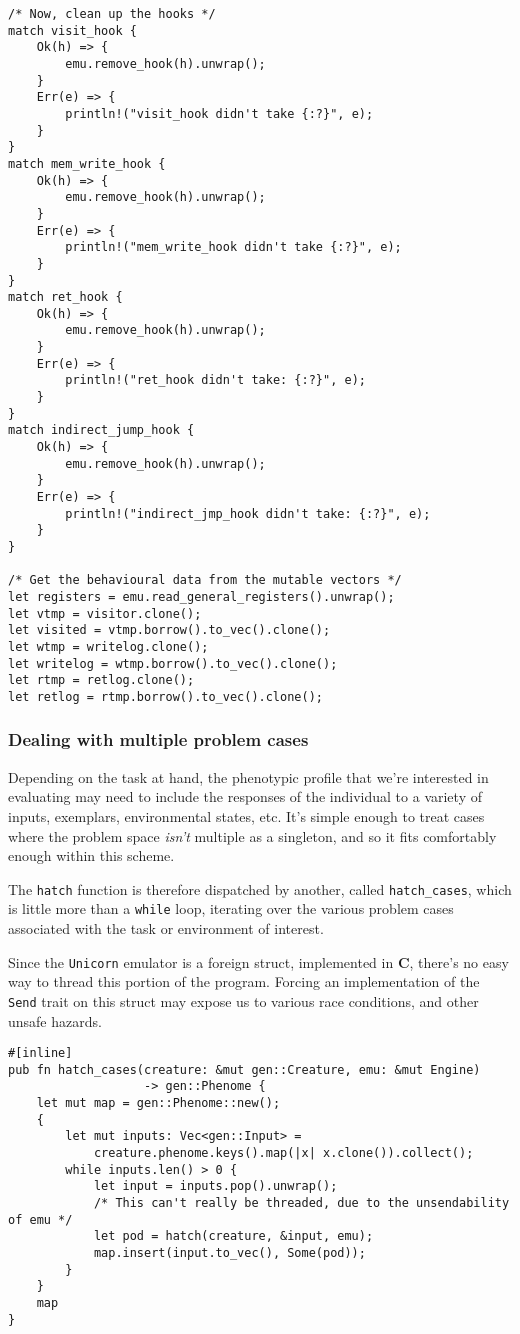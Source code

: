 \documentclass[11pt]{article}
\begin{document}
\lstset{language=rust,label=org4af4e69,caption= ,captionpos=b,numbers=none}
\begin{lstlisting}
/* Now, clean up the hooks */
match visit_hook {
    Ok(h) => {
        emu.remove_hook(h).unwrap();
    }
    Err(e) => {
        println!("visit_hook didn't take {:?}", e);
    }
}
match mem_write_hook {
    Ok(h) => {
        emu.remove_hook(h).unwrap();
    }
    Err(e) => {
        println!("mem_write_hook didn't take {:?}", e);
    }
}
match ret_hook {
    Ok(h) => {
        emu.remove_hook(h).unwrap();
    }
    Err(e) => {
        println!("ret_hook didn't take: {:?}", e);
    }
}
match indirect_jump_hook {
    Ok(h) => {
        emu.remove_hook(h).unwrap();
    }
    Err(e) => {
        println!("indirect_jmp_hook didn't take: {:?}", e);
    }
}

/* Get the behavioural data from the mutable vectors */
let registers = emu.read_general_registers().unwrap();
let vtmp = visitor.clone();
let visited = vtmp.borrow().to_vec().clone();
let wtmp = writelog.clone();
let writelog = wtmp.borrow().to_vec().clone();
let rtmp = retlog.clone();
let retlog = rtmp.borrow().to_vec().clone();
\end{lstlisting}

\subsubsection{Dealing with multiple problem cases}
\label{sec:org1cbea6f}

Depending on the task at hand, the phenotypic profile that we're
interested in evaluating may need to include the responses of the
individual to a variety of inputs, exemplars, environmental states,
etc. It's simple enough to treat cases where the problem space \emph{isn't}
multiple as a singleton, and so it fits comfortably enough within
this scheme. 

The \texttt{hatch} function is therefore dispatched by another, called
\texttt{hatch\_cases}, which is little more than a \texttt{while} loop, iterating
over the various problem cases associated with the task or environment
of interest.

Since the \texttt{Unicorn} emulator is a foreign struct, implemented in \textbf{C},
there's no easy way to thread this portion of the program. Forcing an
implementation of the \texttt{Send} trait on this struct may expose us to
various race conditions, and other unsafe hazards. 

\lstset{language=rust,label=orgd3a88fa,caption= ,captionpos=b,numbers=none}
\begin{lstlisting}
#[inline]
pub fn hatch_cases(creature: &mut gen::Creature, emu: &mut Engine) 
                   -> gen::Phenome {
    let mut map = gen::Phenome::new();
    {
        let mut inputs: Vec<gen::Input> = 
            creature.phenome.keys().map(|x| x.clone()).collect();
        while inputs.len() > 0 {
            let input = inputs.pop().unwrap();
            /* This can't really be threaded, due to the unsendability of emu */
            let pod = hatch(creature, &input, emu);
            map.insert(input.to_vec(), Some(pod));
        }
    }
    map
}
\end{lstlisting}
\end{document}

